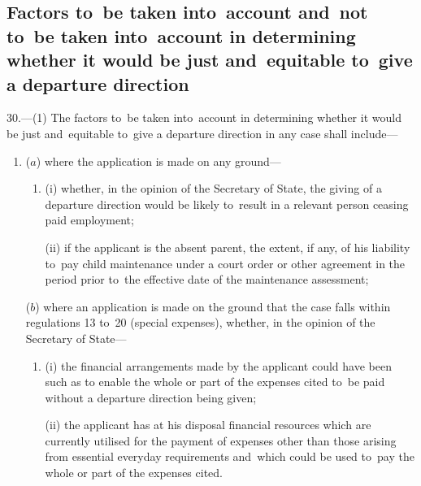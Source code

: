 \documentclass[12pt,a4paper]{article}
\begin{document}
\renewcommand\parthead{--- Part~VI}

\subsection[30. Factors to~be taken into~account and~not to~be taken into~account in
determining whether it would be just and~equitable to~give a departure
direction]{Factors to~be taken into~account and~not to~be taken into~account in
determining whether it would be just and~equitable to~give a departure
direction}

30.—(1) The factors to~be taken into~account in determining whether it
would be just and~equitable to~give a departure direction in any case shall
include—
\begin{enumerate}\item[]
($a$) where the application is made on any ground—
\begin{enumerate}\item[]
(i) whether, in the opinion of the Secretary of State, the giving of a departure
direction would be likely to~result in a relevant person ceasing paid
employment;

(ii) if the applicant is the absent parent, the extent, if any, of his liability
to~pay child maintenance under a court order or other agreement in the period
prior to~the effective date of the maintenance assessment;
\end{enumerate}

($b$) where an application is made on the ground that the case falls within
regulations 13 to~20 (special expenses), whether, in the opinion of the
Secretary of State—
\begin{enumerate}\item[]
(i) the financial arrangements made by the applicant could have been such as to
enable the whole or part of the expenses cited to~be paid without a departure
direction being given;

(ii) the applicant has at his disposal financial resources which are currently
utilised for the payment of expenses other than those arising from essential
everyday requirements and~which could be used to~pay the whole or part of the
expenses cited.
\end{enumerate}
\end{enumerate}
\end{document}
